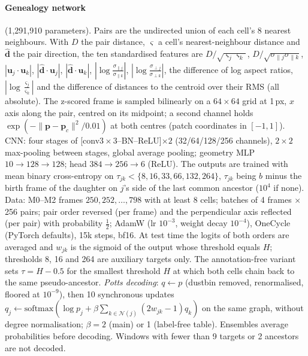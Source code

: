 \paragraph{Genealogy network} (1{,}291{,}910 parameters).
Pairs are the undirected union of each cell's 8 nearest neighbours.
With $D$ the pair distance, $\varsigma$ a cell's nearest-neighbour distance and $\hat{\mathbf{d}}$ the pair direction, the ten standardised features are $D/\sqrt{\varsigma_j\varsigma_k}$, $D/\sqrt{\sigma_{\parallel j}\sigma_{\parallel k}}$, $|\mathbf{u}_j{\cdot}\mathbf{u}_k|$, $|\hat{\mathbf{d}}{\cdot}\mathbf{u}_j|$, $|\hat{\mathbf{d}}{\cdot}\mathbf{u}_k|$, $|\log\frac{\sigma_{\parallel j}}{\sigma_{\parallel k}}|$, $|\log\frac{\sigma_{\perp j}}{\sigma_{\perp k}}|$, the difference of log aspect ratios, $|\log\frac{\varsigma_j}{\varsigma_k}|$ and the difference of distances to the centroid over their RMS (all absolute).
The z-scored frame is sampled bilinearly on a $64{\times}64$ grid at 1\,px, $x$ axis along the pair, centred on its midpoint; a second channel holds $\exp(-\|\mathbf{p}-\mathbf{p}_c\|^2/0.01)$ at both centres (patch coordinates in $[-1,1]$).
CNN: four stages of [conv$3{\times}3$--BN--ReLU]$\times2$ (32/64/128/256 channels), $2{\times}2$ max-pooling between stages, global average pooling; geometry MLP $10{\to}128{\to}128$; head $384{\to}256{\to}6$ (ReLU).
The outputs are trained with mean binary cross-entropy on $\tau_{jk}<\{8,16,33,66,132,264\}$, $\tau_{jk}$ being $b$ minus the birth frame of the daughter on $j$'s side of the last common ancestor ($10^4$ if none).
Data: M0--M2 frames $250,252,\dots,798$ with at least 8 cells; batches of 4 frames $\times$ 256 pairs; pair order reversed (per frame) and the perpendicular axis reflected (per pair) with probability $\frac12$; AdamW (lr $10^{-3}$, weight decay $10^{-4}$), OneCycle (PyTorch defaults), 15k steps, bf16.
At test time the logits of both orders are averaged and $w_{jk}$ is the sigmoid of the output whose threshold equals $H$; thresholds 8, 16 and 264 are auxiliary targets only.
The annotation-free variant sets $\tau{=}H{-}0.5$ for the smallest threshold $H$ at which both cells chain back to the same pseudo-ancestor.
\emph{Potts decoding}: $q\leftarrow p$ (dustbin removed, renormalised, floored at $10^{-9}$), then 10 synchronous updates $q_j\leftarrow\mathrm{softmax}(\log p_j+\beta\sum_{k\in\mathcal{N}(j)}(2w_{jk}{-}1)q_k)$ on the same graph, without degree normalisation; $\beta{=}2$ (main) or 1 (label-free table).
Ensembles average probabilities before decoding. Windows with fewer than 9 targets or 2 ancestors are not decoded.

